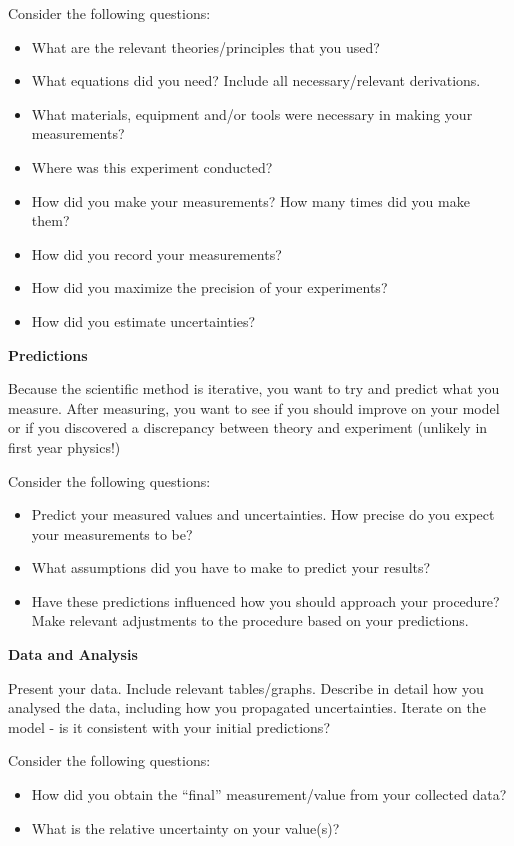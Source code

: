 Consider the following questions:
\begin{itemize}
\item What are the relevant theories/principles that you used? 
\item What equations did you need? Include all necessary/relevant derivations.
\item What materials, equipment and/or tools were necessary in making your measurements?
\item Where was this experiment conducted?
\item How did you make your measurements? How many times did you make them?
\item How did you record your measurements?
\item How did you maximize the precision of your experiments?
\item How did you estimate uncertainties?
\end{itemize}

\textbf{Predictions}

Because the scientific method is iterative, you want to try and predict what you measure. After measuring, you want to see if you should improve on your model or if you discovered a discrepancy between theory and experiment (unlikely in first year physics!)

Consider the following questions:
\begin{itemize}
\item Predict your measured values and uncertainties. How precise do you expect your measurements to be?
\item What assumptions did you have to make to predict your results?
\item Have these predictions influenced how you should approach your procedure? Make relevant adjustments to the procedure based on your predictions.
\end{itemize}

\textbf{Data and Analysis}

Present your data. Include relevant tables/graphs. Describe in detail how you analysed the data, including how you propagated uncertainties. Iterate on the model - is it consistent with your initial predictions?

Consider the following questions:
\begin{itemize}
\item How did you obtain the ``final'' measurement/value from your collected data?
\item What is the relative uncertainty on your value(s)?
\end{itemize}

